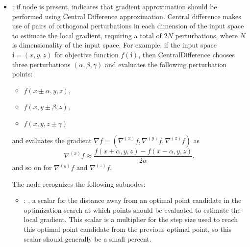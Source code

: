 \begin{itemize}
\begin{itemize}
        \item {}:
          if node is present, indicates that gradient approximation should be performed
          using Central Difference approximation. Central difference makes use of pairs of
          orthogonal perturbations         in each dimension of the input space to estimate the
          local gradient, requiring a total of $2N$         perturbations, where $N$ is
          dimensionality of the input space. For example, if the input space         $\mathbf{i} =
          (x, y, z)$ for objective function $f(\mathbf{i})$, then CentralDifference chooses
          three perturbations $(\alpha, \beta, \gamma)$ and evaluates the following perturbation
          points:         \begin{itemize}           \item $f(x\pm\alpha, y, z)$,           \item
          $f(x, y\pm\beta, z)$,           \item $f(x, y, z\pm\gamma)$         \end{itemize}
          and evaluates the gradient $\nabla f = (\nabla^{(x)} f, \nabla^{(y)} f, \nabla^{(z)} f)$
          as         \begin{equation*}           \nabla^{(x)}f \approx \frac{f(x+\alpha, y, z) -
          f(x-\alpha, y, z)}{2\alpha},         \end{equation*}         and so on for $
          \nabla^{(y)}f$ and $\nabla^{(z)}f$.

          The  node recognizes the following subnodes:
          \begin{itemize}
            \item {}: , 
              a scalar for the distance away from an optimal point candidate in the optimization
              search at which points should be evaluated to estimate the local gradient. This scalar
              is a         multiplier for the step size used to reach this optimal point candidate
              from the previous         optimal point, so this scalar should generally be a small
              percent. 
          \end{itemize}


\end{itemize}
\end{itemize}
